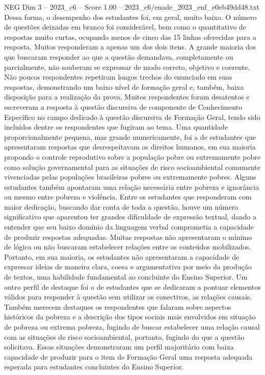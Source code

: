 \begin{textsample}{NEG Dim 3 – 2023\_c6 – Score 1.00 – 2023\_c6/enade\_2023\_enf\_e0eb49dd48.txt}
Dessa forma, o desempenho dos estudantes foi, em geral, muito baixo.
O número de questões deixadas em branco foi considerável, bem como o quantitativo de respostas muito curtas, ocupando menos de cinco das 15 linhas oferecidas para a resposta.
Muitos responderam a apenas um dos dois itens.
A grande maioria dos que buscaram responder ao que a questão demandava, completamente ou parcialmente, não souberam se expressar de modo correto, objetivo e coerente.
Não poucos respondentes repetiram longos trechos do enunciado em suas respostas, demonstrando um baixo nível de formação geral e, também, baixa disposição para a realização da prova.
Muitos respondentes foram desatentos e escreveram a resposta à questão discursiva de componente de Conhecimento Específico no campo dedicado à questão discursiva de Formação Geral, tendo sido incluídos dentre os respondentes que fugiram ao tema.
Uma quantidade proporcionalmente pequena, mas grande numericamente, foi a de estudantes que apresentaram respostas que desrespeitavam os direitos humanos, em sua maioria propondo o controle reprodutivo sobre a população pobre ou extremamente pobre como solução governamental para as situações de risco socioambiental comumente vivenciadas pelas populações brasileiras pobres ou extremamente pobres.
Alguns estudantes também apontaram uma relação necessária entre pobreza e ignorância ou mesmo entre pobreza e violência.
Entre os estudantes que responderam com maior dedicação, buscando dar conta de toda a questão, houve um número significativo que aparentou ter grandes dificuldade de expressão textual, dando a entender que seu baixo domínio da linguagem verbal comprometia a capacidade de produzir respostas adequadas.
Muitas respostas não apresentaram o mínimo de lógica ou não buscaram estabelecer relações entre os conteúdos mobilizados.
Portanto, em sua maioria, os estudantes não apresentaram a capacidade de expressar ideias de maneira clara, coesa e argumentativa por meio da produção de textos, uma habilidade fundamental ao concluinte do Ensino Superior.
Um outro perfil de destaque foi o de estudantes que se dedicaram a pontuar elementos válidos para responder à questão sem utilizar os conectivos, as relações causais.
Também merecem destaques os respondentes que falaram sobre aspectos históricos da pobreza e a descrição dos tipos sociais mais envolvidos em situação de pobreza ou extrema pobreza, fugindo de buscar estabelecer uma relação causal com as situações de risco socioambiental, portanto, fugindo do que a questão solicitava.
Essas situações demonstraram um perfil majoritário com baixa capacidade de produzir para o item de Formação Geral uma resposta adequada esperada para estudantes concluintes do Ensino Superior.

\end{textsample}

